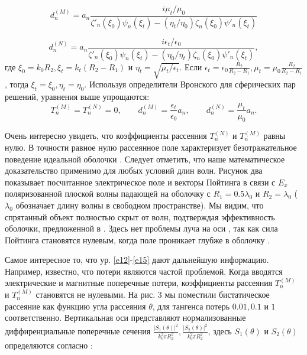 \documentclass[a4paper, 12pt]{article}
\begin{document}
\begin{equation}\label{e14}
	d_n^{(M)} = a_n \frac{i\mu_t/\mu_0}{\zeta'_n(\xi_0)\psi_n(\xi_t)-(\eta_t/\eta_0)\zeta_n(\xi_0)\psi'_n(\xi_t)}
\end{equation}

\begin{equation}\label{e15}
	d_n^{(N)} = a_n \frac{i\epsilon_t/\epsilon_0}{\zeta'_n(\xi_0)\psi_n(\xi_t)-(\eta_0/\eta_t)\zeta_n(\xi_0)\psi'_n(\xi_t)},
\end{equation}
где $\xi_0=k_0R_2, \xi_t=k_t(R_2-R_1)$ и $\eta_t=\sqrt{\mu_t/\epsilon_t}$.
Если $\epsilon_t=\epsilon_0 \frac{R_2}{R_2-R_1}, \mu_t=\mu_0 \frac{R_2}{R_2-R_1}$,
тогда $\xi_t=\xi_0, \eta_t=\eta_0$.
Используя определители Вронского для сферических пар решений, уравнения выше
упрощаются:
\begin{equation}\label{e16}
	T_n^{(M)}=T_n^{(N)}=0, \qquad d_n^{(M)}=\frac{\epsilon_t}{\epsilon_0}a_n,
	\qquad d_n^{(N)}=\frac{\mu_t}{\mu_0}a_n.
\end{equation}

Очень интересно увидеть, что коэффициенты рассеяния $T_n^{(N)}$ и $T_n^{(M)}$
равны нулю. В точности равное нулю рассеянное поле характеризует безотражательное
поведение идеальной оболочки \cite{4}. Следует отметить, что наше математическое
доказательство применимо для любых условий длин волн. Рисунок два показывает
посчитанное электрическое поле и векторы Пойтинга в связи с $E_x$ поляризованной
плоской волны падающей на оболочку с $R_1=0.5\lambda_0$ и $R_2=\lambda_0$
($\lambda_0$ обозначает длину волны в свободном пространстве). Мы видим, что
спрятанный объект полностью скрыт от волн, подтверждая эффективность оболочки,
предложенной в \cite{4}. Здесь нет проблемы луча на оси \cite{4}, так как сила
Пойтинга становятся нулевым, когда поле проникает глубже в оболочку \cite{4}.

Самое интересное то, что ур. \eqref{e12}-\eqref{e15} дают дальнейшую информацию. 
Например, известно, что потери являются частой проблемой. Когда вводятся 
электрические и магнитные поперечные потери, коэффициенты рассеяния 
$T_n^{(M)}$ и $T_n^{(M)}$
становятся не нулевыми. На рис. 3 мы поместили бистатическое рассеяние 
как функцию угла рассеяния $\theta$, для тангенса потерь $0.01, 0.1$ и $1$ 
соответственно. Вертикальная оси представляют нормализованные диффиренциальные 
поперечные сечения 
$\frac{|S_1(\theta)|^2}{k_0^2\pi R_2^2}, \frac{|S_2(\theta)|^2}{k_0^2\pi R_2^2}$,
здесь $S_1(\theta)$ и $S_2(\theta)$ определяются согласно \cite{12}:
\end{document}
